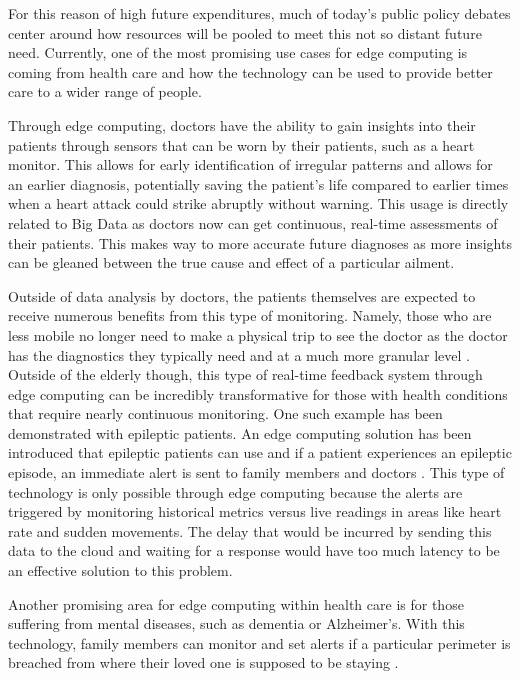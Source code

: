 \documentclass[sigconf]{acmart}
\begin{document}
For this reason of high future expenditures, much of today's public policy debates center around how resources will be pooled to meet this not so distant future need. Currently, one of the most promising use cases for edge computing is coming from health care and how the technology can be used to provide better care to a wider range of people. 

Through edge computing, doctors have the ability to gain insights into their patients through sensors that can be worn by their patients, such as a heart monitor. This allows for early identification of irregular patterns and allows for an earlier diagnosis, potentially saving the patient's life compared to earlier times when a heart attack could strike abruptly without warning. This usage is directly related to Big Data as doctors now can get continuous, real-time assessments of their patients. This makes way to more accurate future diagnoses as more insights can be gleaned between the true cause and effect of a particular ailment.

Outside of data analysis by doctors, the patients themselves are expected to receive numerous benefits from this type of monitoring. Namely, those who are less mobile no longer need to make a physical trip to see the doctor as the doctor has the diagnostics they typically need and at a much more granular level \cite{elderly}. 
Outside of the elderly though, this type of real-time feedback system through edge computing can be incredibly transformative for those with health conditions that require nearly continuous monitoring. One such example has been demonstrated with epileptic patients. An edge computing solution has been introduced that epileptic patients can use and if a patient experiences an epileptic episode, an immediate alert is sent to family members and doctors \cite{edgehealth}. This type of technology is only possible through edge computing because the alerts are triggered by monitoring historical metrics versus live readings in areas like heart rate and sudden movements. The delay that would be incurred by sending this data to the cloud and waiting for a response would have too much latency to be an effective solution to this problem.  

Another promising area for edge computing within health care is for those suffering from mental diseases, such as dementia or Alzheimer's. With this technology, family members can monitor and set alerts if a particular perimeter is breached from where their loved one is supposed to be staying \cite{seniorgps}. 
\end{document}

